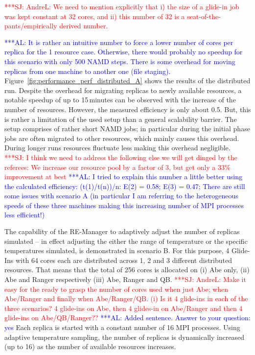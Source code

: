 \documentclass{rspublic}
\newcommand{\alnote}[1]{ {\textcolor{blue} { ***AL: #1 }}}
\newcommand{\jhanote}[1]{ {\textcolor{red} { ***SJ: #1 }}}
\newcommand{\alnote}[1]{}
\newcommand{\jhanote}[1]{}
\begin{document}
\jhanote{AndreL: We need to mention explicitly that i) the size of a
  glide-in job was kept constant at 32 cores, and ii) this number of 32
  is a seat-of-the-pants/empirically derived number.}

\alnote{It is rather an intuitive number to force a lower number of
  cores per replica for the 1 resource case. Otherwise, there would
  probably no speedup for this scenario with only 500 NAMD
  steps. There is some overhead for moving replicas from one machine
  to another one (file staging).}
Figure~\ref{fig:performance_perf_distributed_A} shows the results of
the distributed run. Despite the overhead for migrating replicas to
newly available resources, a notable speedup of up to 15\,minutes can
be observed with the increase of the number of resources. However, the
measured efficiency is only about 0.5. But, this is rather a
limitation of the used setup than a general scalability barrier.  The
setup comprises of rather short NAMD jobs; in particular during the
initial phase jobs are often migrated to other resources, which mainly
causes this overhead. During longer runs resources fluctuate less
making this overhead negligible.  \jhanote{I think we need to address
  the following else we will get dinged by the referees: We increase
  our resource pool by a factor of 3, but get only a 33\% improvement
  at best} \alnote{I tried to explain this number a little better
  using the calculated efficiency: (t(1)/t(n))/n: E(2) = 0.58; E(3) =
  0.47; There are still some issues with scenario A (in particular I
  am referring to the heterogeneous speeds of these three machines
  making this increasing number of MPI processes less efficient!)}

The capability of the RE-Manager to adaptively adjust the number of
replicas simulated -- in effect adjusting the either the range of
temperature or the specific temperatures simulated, is demonstrated in
scenario B. For this purpose, 4 Glide-Ins with 64 cores each are
distributed across 1, 2 and 3 different distributed resources. That
means that the total of 256 cores is allocated on (i) Abe only, (ii)
Abe and Ranger respectively (iii) Abe, Ranger and QB.
\jhanote{AndreL: Make it easy for the ready to grasp the number of
  cores used when just Abe; when Abe/Ranger and finally when
  Abe/Ranger/QB. (i) Is it 4 glide-ins in each of the three scenarios?
  4 glide-ins on Abe, then 4 glides-in on Abe/Ranger and then 4
  glide-ins on Abe/QB/Ranger??}  \alnote{Added sentence. Answer to
  your question: yes} Each replica is started with a constant number
of 16 MPI processes.  Using adaptive temperature sampling, the number
of replicas is dynamically increased (up to 16) as the number of
available resources increases.
\end{document}
